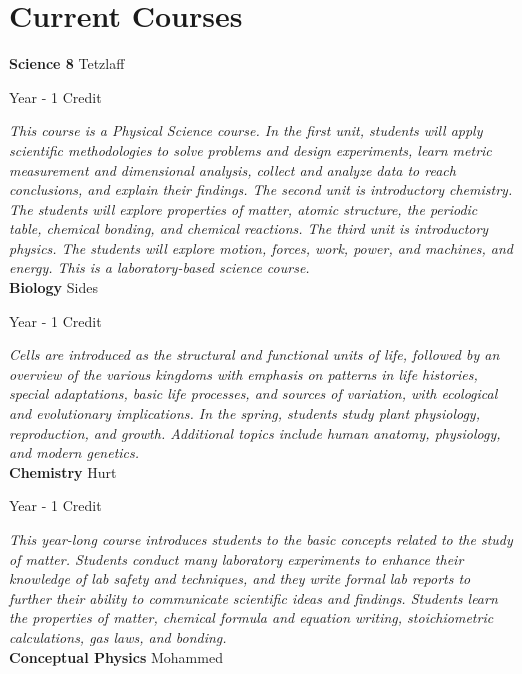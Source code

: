 \section{Current Courses}

\noindent\textbf{Science 8} \hfill Tetzlaff

\noindent Year - 1 Credit

\vspace{1mm}\emph{This course is a Physical Science course. In the first unit, students will apply scientific methodologies to solve problems and design experiments, learn metric measurement and dimensional analysis, collect and analyze data to reach conclusions, and explain their findings. The second unit is introductory chemistry. The students will explore properties of matter, atomic structure, the periodic table, chemical bonding, and chemical reactions. The third unit is introductory physics. The students will explore motion, forces, work, power, and machines, and energy. This is a laboratory-based science course.}\\


\noindent\textbf{Biology} \hfill Sides

\noindent Year - 1 Credit

\vspace{1mm}\emph{Cells are introduced as the structural and functional units of life, followed by an overview of the various kingdoms with emphasis on patterns in life histories, special adaptations, basic life processes, and sources of variation, with ecological and evolutionary implications.  In the spring, students study plant physiology, reproduction, and growth.  Additional topics include human anatomy, physiology, and modern genetics.}\\


\noindent\textbf{Chemistry} \hfill Hurt

\noindent Year - 1 Credit

\vspace{1mm}\emph{This year-long course introduces students to the basic concepts related to the study of matter.  Students conduct many laboratory experiments to enhance their knowledge of lab safety and techniques, and they write formal lab reports to further their ability to communicate scientific ideas and findings. Students learn the properties of matter, chemical formula and equation writing, stoichiometric calculations, gas laws, and bonding.}\\


\noindent\textbf{Conceptual Physics} \hfill Mohammed


